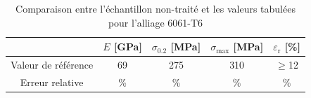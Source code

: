 \begin{table}[h]
    \centering
    \begin{tabular}{ |c||c|c|c|c| }
        \cline{2-5}
        \multicolumn{1}{c|}{} & \(E\) [GPa] & \(\sigma_{0.2}\) [MPa] & \(\sigma_{\textrm{max}}\) [MPa] & \(\varepsilon_{\textrm{r}}\) [\%] \\
        \hline
        \multirow{1}{4cm}{Valeur de référence \cite{alualualu}}
        & 69 & 275 & 310 & \(\ge\)12 \\
        \hline
        \multirow{1}{4cm}{Erreur relative}
        & \% & \% & \% & \% \\
        \hline
    \end{tabular}
    \caption{Comparaison entre l'échantillon non-traité et les valeurs tabulées pour l'alliage 6061-T6 \cite{alualualu}}
    \label{tab:err_rel}
\end{table}

